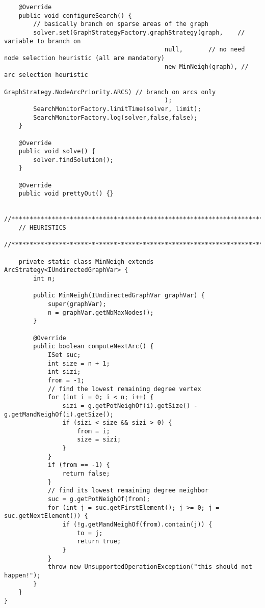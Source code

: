 \documentclass{article}
\begin{document}
\begin{lstlisting}
	@Override
	public void configureSearch() {
		// basically branch on sparse areas of the graph
		solver.set(GraphStrategyFactory.graphStrategy(graph, 	// variable to branch on
											null, 		// no need node selection heuristic (all are mandatory)
											new MinNeigh(graph), // arc selection heuristic
											GraphStrategy.NodeArcPriority.ARCS) // branch on arcs only
											);
		SearchMonitorFactory.limitTime(solver, limit);
		SearchMonitorFactory.log(solver,false,false);
	}

	@Override
	public void solve() {
		solver.findSolution();
	}

	@Override
	public void prettyOut() {}

	//***********************************************************************************
	// HEURISTICS
	//***********************************************************************************

	private static class MinNeigh extends ArcStrategy<IUndirectedGraphVar> {
		int n;

		public MinNeigh(IUndirectedGraphVar graphVar) {
			super(graphVar);
			n = graphVar.getNbMaxNodes();
		}

		@Override
		public boolean computeNextArc() {
			ISet suc;
			int size = n + 1;
			int sizi;
			from = -1;
			// find the lowest remaining degree vertex
			for (int i = 0; i < n; i++) {
				sizi = g.getPotNeighOf(i).getSize() - g.getMandNeighOf(i).getSize();
				if (sizi < size && sizi > 0) {
					from = i;
					size = sizi;
				}
			}
			if (from == -1) {
				return false;
			}
			// find its lowest remaining degree neighbor
			suc = g.getPotNeighOf(from);
			for (int j = suc.getFirstElement(); j >= 0; j = suc.getNextElement()) {
				if (!g.getMandNeighOf(from).contain(j)) {
					to = j;
					return true;
				}
			}
			throw new UnsupportedOperationException("this should not happen!");
		}
	}
}
\end{lstlisting}
\end{document}
